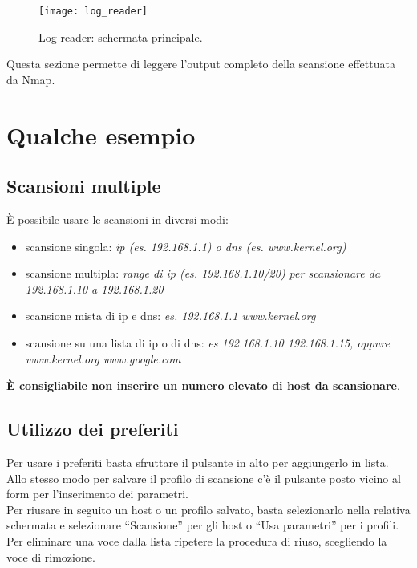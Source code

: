 \begin{figure}[h]
  \centering
  \texttt{[image: log\_reader]}
  \caption{Log reader: schermata principale.}
  \label{fig:LodReader}
\end{figure}
Questa sezione permette di leggere l'output completo della scansione 
effettuata da Nmap.

\chapter{Qualche esempio}
\label{ch:Examples}

\section{Scansioni multiple}
\label{sec:ExamplesMultipleScan}

\`E possibile usare le scansioni in diversi modi:
\begin{itemize}
\item scansione singola: \emph{ip (es. 192.168.1.1) o dns (es. www.kernel.org)}
\item scansione multipla: \emph{range di ip (es. 192.168.1.10/20) per scansionare 
  da 192.168.1.10 a 192.168.1.20}
\item scansione mista di ip e dns: \emph{es. 192.168.1.1 www.kernel.org}
\item scansione su una lista di ip o di dns: \emph{es 192.168.1.10 192.168.1.15, 
  oppure www.kernel.org www.google.com}
\end{itemize}
\textbf{\`E consigliabile non inserire un numero elevato di host da scansionare}.

\section{Utilizzo dei preferiti}
\label{sec:ExamplesUseBookmarks}

Per usare i preferiti basta sfruttare il pulsante in alto per aggiungerlo in lista.\\
Allo stesso modo per salvare il profilo di scansione c'\`e il pulsante posto vicino 
al form per l'inserimento dei parametri.\\
Per riusare in seguito un host o un profilo salvato, basta selezionarlo nella relativa 
schermata e selezionare ``Scansione'' per gli host o ``Usa parametri'' per i profili.\\ 
Per eliminare una voce dalla lista ripetere la procedura di riuso, scegliendo la voce di 
rimozione.
